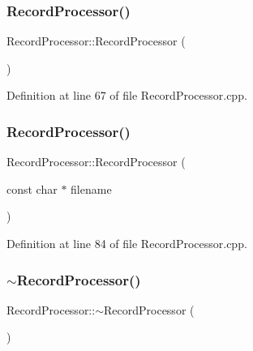 \subsubsection{\texorpdfstring{Record\+Processor()}{RecordProcessor()}\hspace{0.1cm}{\footnotesize\ttfamily [1/2]}}
{\footnotesize\ttfamily Record\+Processor\+::\+Record\+Processor (\begin{DoxyParamCaption}{ }\end{DoxyParamCaption})}



Definition at line 67 of file Record\+Processor.\+cpp.

\mbox{\label{class_record_processor_aa64ac5cbddceb678e8cb27e9fc58576c}} 
\subsubsection{\texorpdfstring{Record\+Processor()}{RecordProcessor()}\hspace{0.1cm}{\footnotesize\ttfamily [2/2]}}
{\footnotesize\ttfamily Record\+Processor\+::\+Record\+Processor (\begin{DoxyParamCaption}\item[{const char $\ast$}]{filename }\end{DoxyParamCaption})}



Definition at line 84 of file Record\+Processor.\+cpp.

\mbox{\label{class_record_processor_a63fbf98c72bafa6c2e24a3962bdae70c}} 
\subsubsection{\texorpdfstring{$\sim$\+Record\+Processor()}{~RecordProcessor()}}
{\footnotesize\ttfamily Record\+Processor\+::$\sim$\+Record\+Processor (\begin{DoxyParamCaption}{ }\end{DoxyParamCaption})}



